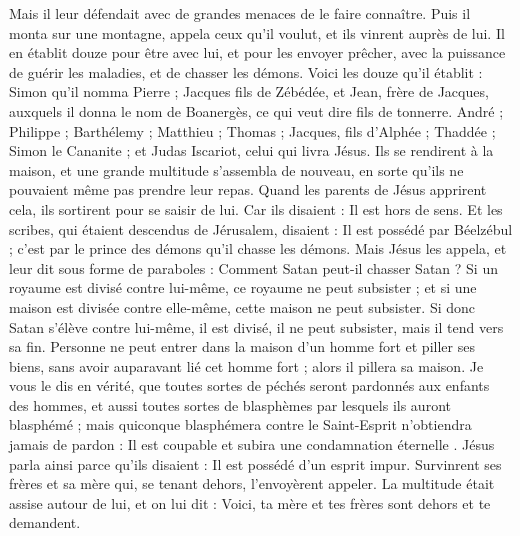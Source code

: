 \begin{multicols}{2}
Mais il leur défendait avec de grandes menaces de le faire connaître.
Puis il monta sur une montagne, appela ceux qu'il voulut, et ils vinrent auprès de lui.
Il en établit douze pour être avec lui,
et pour les envoyer prêcher, avec la puissance de guérir les maladies, et de chasser les démons.
Voici les douze qu’il établit : Simon qu'il nomma Pierre ;
Jacques fils de Zébédée, et Jean, frère de Jacques, auxquels il donna le nom de Boanergès, ce qui veut dire fils de tonnerre.
André ; Philippe ; Barthélemy ; Matthieu ; Thomas ; Jacques, fils d'Alphée ; Thaddée ; Simon le Cananite ;
et Judas Iscariot, celui qui livra Jésus.
Ils se rendirent à la maison, et une grande multitude s’assembla de nouveau, en sorte qu’ils ne pouvaient même pas prendre leur repas.
Quand les parents de Jésus apprirent cela, ils sortirent pour se saisir de lui. Car ils disaient : Il est hors de sens.
Et les scribes, qui étaient descendus de Jérusalem, disaient : Il est possédé par Béelzébul ; c’est par le prince des démons qu’il chasse les démons.
Mais Jésus les appela, et leur dit sous forme de paraboles : Comment Satan peut-il chasser Satan ?
Si un royaume est divisé contre lui-même, ce royaume ne peut subsister ;
et si une maison est divisée contre elle-même, cette maison ne peut subsister.
Si donc Satan s'élève contre lui-même, il est divisé, il ne peut subsister, mais il tend vers sa fin.
Personne ne peut entrer dans la maison d'un homme fort et piller ses biens, sans avoir auparavant lié cet homme fort ; alors il pillera sa maison.
Je vous le dis en vérité, que toutes sortes de péchés seront pardonnés aux enfants des hommes, et aussi toutes sortes de blasphèmes par lesquels ils auront blasphémé ;
mais quiconque blasphémera contre le Saint-Esprit n’obtiendra jamais de pardon : Il est coupable et subira une condamnation éternelle {}.
Jésus parla ainsi parce qu'ils disaient : Il est possédé d'un esprit impur.
Survinrent ses frères et sa mère qui, se tenant dehors, l'envoyèrent appeler. La multitude était assise autour de lui,
et on lui dit : Voici, ta mère et tes frères sont dehors et te demandent.

\end{multicols}
